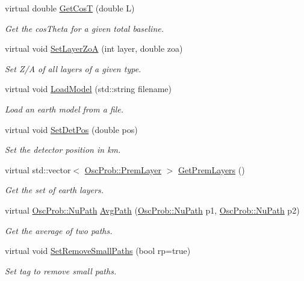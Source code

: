 \begin{DoxyCompactItemize}
virtual double \hyperlink{classOscProb_1_1PremModel_a5328474bdbb703eb4c9d4df49999cda6}{Get\+CosT} (double L)
\begin{DoxyCompactList}\small\item\em Get the cos\+Theta for a given total baseline. \end{DoxyCompactList}\item 
virtual void \hyperlink{classOscProb_1_1PremModel_ac9887d1af4b3c02925fe3228349f593d}{Set\+Layer\+ZoA} (int layer, double zoa)
\begin{DoxyCompactList}\small\item\em Set Z/A of all layers of a given type. \end{DoxyCompactList}\item 
virtual void \hyperlink{classOscProb_1_1PremModel_a6363a5e711dd8b0d2e684677e585b293}{Load\+Model} (std\+::string filename)
\begin{DoxyCompactList}\small\item\em Load an earth model from a file. \end{DoxyCompactList}\item 
virtual void \hyperlink{classOscProb_1_1PremModel_a55b314e97ed9b92931e08ada0c0947eb}{Set\+Det\+Pos} (double pos)
\begin{DoxyCompactList}\small\item\em Set the detector position in km. \end{DoxyCompactList}\item 
virtual std\+::vector$<$ \hyperlink{structOscProb_1_1PremLayer}{Osc\+Prob\+::\+Prem\+Layer} $>$ \hyperlink{classOscProb_1_1PremModel_ae4feeccc7027253f5c2e2493098145ca}{Get\+Prem\+Layers} ()
\begin{DoxyCompactList}\small\item\em Get the set of earth layers. \end{DoxyCompactList}\item 
virtual \hyperlink{structOscProb_1_1NuPath}{Osc\+Prob\+::\+Nu\+Path} \hyperlink{classOscProb_1_1PremModel_a646977424cdca178a77694397146c2f8}{Avg\+Path} (\hyperlink{structOscProb_1_1NuPath}{Osc\+Prob\+::\+Nu\+Path} p1, \hyperlink{structOscProb_1_1NuPath}{Osc\+Prob\+::\+Nu\+Path} p2)
\begin{DoxyCompactList}\small\item\em Get the average of two paths. \end{DoxyCompactList}\item 
virtual void \hyperlink{classOscProb_1_1PremModel_ac5496d6d5bafcf7740c60838d3eee7b3}{Set\+Remove\+Small\+Paths} (bool rp=true)
\begin{DoxyCompactList}\small\item\em Set tag to remove small paths. \end{DoxyCompactList}\end{DoxyCompactItemize}
